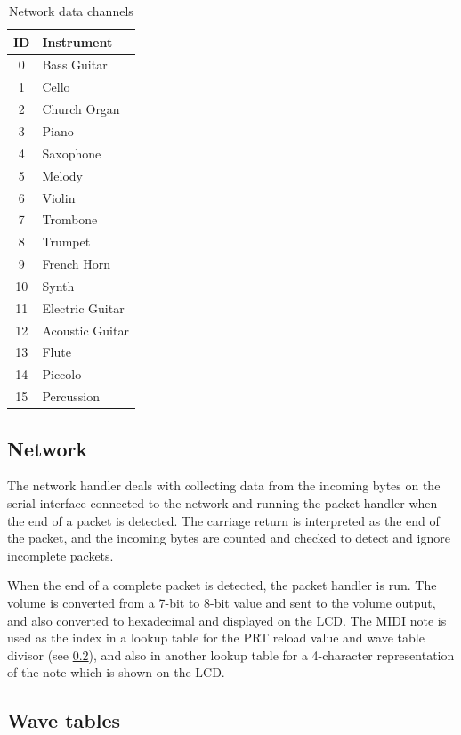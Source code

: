 \begin{nowordcount}
\begin{table}[htbp]
\centering
\begin{tabular}[bp]{c l}
ID & Instrument \\
\hline
0 & Bass Guitar \\
1 & Cello \\
2 & Church Organ \\
3 & Piano \\
4 & Saxophone \\
5 & Melody \\
6 & Violin \\
7 & Trombone \\
8 & Trumpet \\
9 & French Horn \\
10 & Synth \\
11 & Electric Guitar \\
12 & Acoustic Guitar \\
13 & Flute \\
14 & Piccolo \\
15 & Percussion
\end{tabular}
\caption{Network data channels}\label{tab:channelids}
\end{table}
\end{nowordcount}

\subsection{Network}

The network handler deals with collecting data from the incoming bytes on the serial interface 
connected to the network and running the packet handler when the end of a packet is detected.  The 
carriage return is interpreted as the end of the packet, and the incoming bytes are counted and 
checked to detect and ignore incomplete packets.

When the end of a complete packet is detected, the packet handler is run.  The volume is converted 
from a 7-bit to 8-bit value and sent to the volume output, and also converted to hexadecimal and 
displayed on the LCD.  The MIDI note is used as the index in a lookup table for the PRT reload value 
and wave table divisor (see \ref{wavetables}), and also in another lookup table for a 4-character 
representation of the note which is shown on the LCD.

\subsection{Wave tables}
\label{wavetables}

